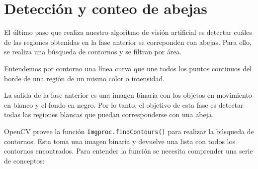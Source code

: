 
\section{Detección y conteo de abejas}\label{deteccion-y-conteo-de-abejas}

El último paso que realiza nuestro algoritmo de visión artificial es
detectar cuáles de las regiones obtenidas en la fase anterior se
correponden con abejas. Para ello, se realiza una búsqueda de contornos
y se filtran por área.

Entendemos por contorno una línea curva que une todos los puntos
continuos del borde de una región de un mismo color o intensidad.

La salida de la fase anterior es una imagen binaria con los objetos en
movimiento en blanco y el fondo en negro. Por lo tanto, el objetivo de
esta fase es detectar todas las regiones blancas que puedan
corresponderse con una abeja.

OpenCV provee la función \texttt{Imgproc.findContours()} para realizar
la búsqueda de contornos. Esta toma una imagen binaria y devuelve una
lista con todos los contornos encontrados. Para entender la función se
necesita comprender una serie de conceptos: \citep{opencv:contours}

